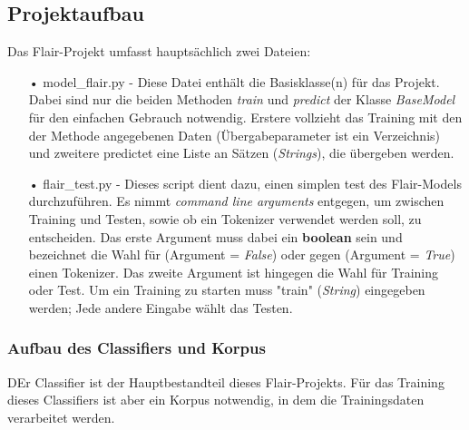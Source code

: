 \documentclass[10pt,a4paper]{article}
\begin{document}
\subsection{Projektaufbau}
\begin{flushleft}
Das Flair-Projekt umfasst hauptsächlich zwei Dateien:
\end{flushleft}
\begin{itemize}
\item[•] model\_flair.py - Diese Datei enthält die Basisklasse(n) für das Projekt. Dabei sind nur die beiden Methoden \textit{train} und \textit{predict} der Klasse \textit{BaseModel} für den einfachen Gebrauch notwendig. Erstere vollzieht das Training mit den der Methode angegebenen Daten (Übergabeparameter ist ein Verzeichnis) und zweitere predictet eine Liste an Sätzen (\textit{Strings}), die übergeben werden.
\item[•] flair\_test.py - Dieses script dient dazu, einen simplen test des Flair-Models durchzuführen. Es nimmt \textit{command line arguments} entgegen, um zwischen Training und Testen, sowie ob ein Tokenizer verwendet werden soll, zu entscheiden. Das erste Argument muss dabei ein \textbf{boolean} sein und bezeichnet die Wahl für (Argument = \textit{False}) oder gegen (Argument = \textit{True}) einen Tokenizer. Das zweite Argument ist hingegen die Wahl für Training oder Test. Um ein Training zu starten muss "train" (\textit{String}) eingegeben werden; Jede andere Eingabe wählt das Testen.
\end{itemize}

\subsubsection{Aufbau des Classifiers und Korpus}
\begin{flushleft}
DEr Classifier ist der Hauptbestandteil dieses Flair-Projekts. Für das Training dieses Classifiers ist aber ein Korpus notwendig, in dem die Trainingsdaten verarbeitet werden.
\end{flushleft}
\end{document}

